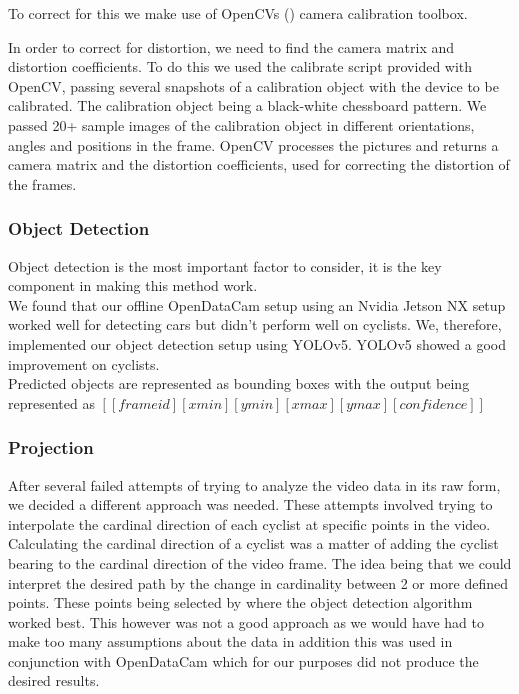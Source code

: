 To correct for this we make use of OpenCVs (\cite{noauthor_opencv/opencv_2021}) camera calibration toolbox.

In order to correct for distortion, we need to find the camera matrix and distortion coefficients. To do this we used the calibrate script provided with OpenCV,
passing several snapshots of a calibration object with the device to be calibrated. The calibration object being a black-white chessboard pattern.
We passed 20+ sample images of the calibration object in different orientations, angles and positions in the frame. OpenCV processes the pictures and
returns a camera matrix and the distortion coefficients, used for correcting the distortion of the frames.
\ \\

\subsubsection{Object Detection}
Object detection is the most important factor to consider, it is the key component in making this method work.
\ \\

We found that our offline OpenDataCam setup using an Nvidia Jetson NX setup worked well for detecting cars but didn't perform well on cyclists. 
We, therefore, implemented our object detection setup using
YOLOv5. YOLOv5 showed a good improvement on cyclists.
\ \\ 
Predicted objects are represented as bounding boxes with the output being represented as $[[frame id][xmin][ymin][xmax][ymax][confidence]]$

\color{red}
\subsubsection{Projection}
After several failed attempts of trying to analyze the video data in its raw form, we decided a different approach was needed.
These attempts involved trying to interpolate the cardinal direction of each cyclist at specific points in the video. Calculating the cardinal direction
of a cyclist was a matter of adding the cyclist bearing to the cardinal direction of the video frame. The idea being that we could interpret
the desired path by the change in cardinality between 2 or more defined points. These points being selected by where the object detection algorithm worked best.
This however was not a good approach as we would have had to make too many assumptions about the data in addition this was used in conjunction
with OpenDataCam which for our purposes did not produce the desired results.
\color{black}
\ \\

